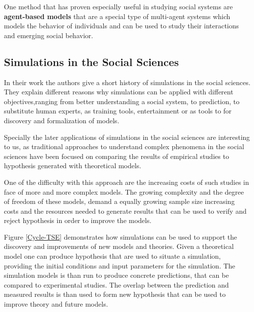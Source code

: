 \bb

One method that has proven especially useful in studying social systems are
\textbf{agent-based models}\cite{Jackson2017} that are a special type of multi-agent systems
which models the behavior of individuals and can be used to study their interactions
and emerging social behavior.

\subsection{Simulations in the Social Sciences}
In their work \cite{gilbert2005simulation} the authors give a short history of
simulations in the social sciences. They explain different reasons why simulations
can be applied with different objectives,ranging from better understanding a social
system, to prediction, to substitute human experts, as training tools, entertainment
or as tools to for discovery and formalization of models.

\bb

Specially the later applications of simulations in the social sciences are interesting
to us, as traditional approaches to understand complex phenomena in the social sciences
have been focused on comparing the results of empirical studies to hypothesis
generated with theoretical models.

One of the difficulty with this approach are the increasing costs of such studies
in face of more and more complex models. The growing complexity and the degree of
freedom of these models, demand a equally growing sample size increasing costs and the
resources needed to generate results that can be used to verify and reject hypothesis
in order to improve the models.

\bb

Figure \ref{Cycle-TSE} demonstrates how simulations can be used to support
the discovery and improvements of new models and theories. Given a theoretical model
one can produce hypothesis that are used to situate a simulation, providing the initial
conditions and input parameters for the simulation. The simulation models is than
run to produce concrete predictions, that can be compared to experimental studies.
The overlap between the prediction and measured results is than used to form new
hypothesis that can be used to improve theory and future models.


\begin{figure}[H]
\end{figure}

